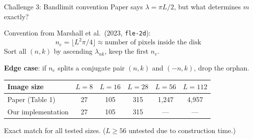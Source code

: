 \documentclass[aspectratio=169]{beamer}
\begin{document}
\begin{frame}{Challenge 3: Bandlimit convention}
  Paper says $\lambda = \pi L / 2$, but what determines $m$ exactly?

  \bigskip

  Convention from Marshall et al.\ (2023, \texttt{fle-2d}):
  \[
    n_e = \lfloor L^2 \pi / 4 \rfloor \approx \text{number of pixels inside the disk}
  \]
  Sort all $(n, k)$ by ascending $\lambda_{nk}$, keep the first $n_e$.

  \bigskip

  \textbf{Edge case}: if $n_e$ splits a conjugate pair $(n, k)$ and $(-n, k)$, drop the orphan.

  \bigskip

  \begin{table}
    \scriptsize
    \begin{tabular}{lccccc}
      \toprule
      \textbf{Image size} & $L=8$ & $L=16$ & $L=28$ & $L=56$ & $L=112$ \\
      \midrule
      Paper (Table 1) & 27 & 105 & 315 & 1{,}247 & 4{,}957 \\
      Our implementation & 27 & 105 & 315 & --- & --- \\
      \bottomrule
    \end{tabular}
  \end{table}

  \smallskip

  Exact match for all tested sizes. ($L \geq 56$ untested due to construction time.)
\end{frame}
\end{document}
